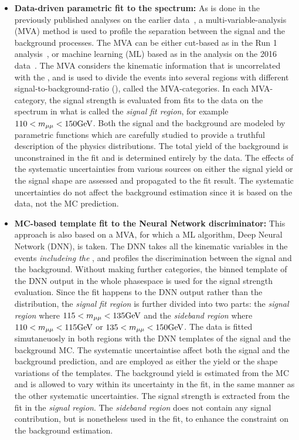 \begin{itemize}
    \item \textbf{Data-driven parametric fit to the \mmm spectrum:} 
          As is done in the previously published analyses on the earlier data~\cite{2015184, PhysRevLett.122.021801},  
          a multi-variable-analysis (MVA) method is used to profile the separation between the signal and the background processes. 
          The MVA can be either cut-based as in the Run 1 analysis~\cite{2015184}, or machine learning (ML) based as in the analysis on the 2016 data~\cite{PhysRevLett.122.021801}.
          The MVA considers the kinematic information that is uncorrelated with the \mmm, and is used to divide the events into several regions 
          with different signal-to-background-ratio (\SoB), called the MVA-categories. 
          In each MVA-category, the signal strength is evaluated from fits to the data on the \mmm spectrum in what is called the \textit{signal fit region}, for example $110<m_{\mu\mu}<150 \mbox{GeV}$.
          Both the signal and the background are modeled by parametric functions which are carefully studied to provide a truthful description of the physics distributions. 
          The total yield of the background is unconstrained in the fit and is determined entirely by the data.
          The effects of the systematic uncertainties from various sources on either the signal yield or the signal shape are assessed and propagated to the fit result. 
          The systematic uncertainties do not affect the background estimation since it is based on the data, not the MC prediction.
    \item \textbf{MC-based template fit to the Neural Network discriminator:}
          This approach is also based on a MVA, for which a ML algorithm, Deep Neural Network (DNN), is taken.
          The DNN takes all the kinematic variables in the events \textit{includeing the \mmm}, and profiles the discrimination between the signal and the background.
          Without making further categories, the binned template of the DNN output in the whole phasespace is used for the signal strength evaluation.
          Since the fit happens to the DNN output rather than the \mmm distribution, the \textit{signal fit region} is further divided into two parts:
          the \textit{signal region} where $115<m_{\mu\mu}<135 \mbox{GeV}$ and the \textit{sideband region} where $110<m_{\mu\mu}<115 \mbox{GeV}$ or $135<m_{\mu\mu}<150 \mbox{GeV}$.
          The data is fitted simutaneuosly in both regions with the DNN templates of the signal and the background MC. 
          The systematic uncertaintise affect both the signal and the background prediction, and are employed as either the yield or the shape variations of the templates.
          The background yield is estimated from the MC and is allowed to vary within its uncertainty in the fit, in the same manner as the other systematic uncertainties.
          The signal strength is extracted from the fit in the \textit{signal region}.
          The \textit{sideband region} does not contain any signal contribution, but is nonetheless used in the fit, to enhance the constraint on the background estimation.
\end{itemize}

